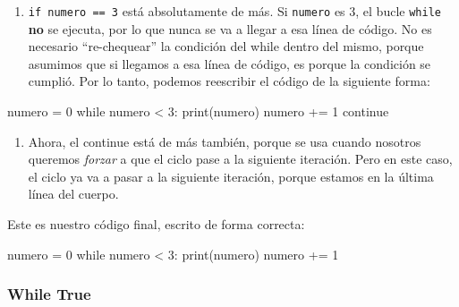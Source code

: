 \documentclass[
  letterpaper,
  DIV=11,
  numbers=noendperiod]{scrreprt}
\newenvironment{Shaded}{\begin{snugshade}}{\end{snugshade}}
\newcommand{\BuiltInTok}[1]{\textcolor[rgb]{0.00,0.23,0.31}{#1}}
\newcommand{\ControlFlowTok}[1]{\textcolor[rgb]{0.00,0.23,0.31}{#1}}
\newcommand{\DecValTok}[1]{\textcolor[rgb]{0.68,0.00,0.00}{#1}}
\newcommand{\NormalTok}[1]{\textcolor[rgb]{0.00,0.23,0.31}{#1}}
\newcommand{\OperatorTok}[1]{\textcolor[rgb]{0.37,0.37,0.37}{#1}}
\providecommand{\tightlist}{%
  \setlength{\itemsep}{0pt}\setlength{\parskip}{0pt}}\usepackage{longtable,booktabs,array}
\begin{document}
\begin{enumerate}
\def\labelenumi{\arabic{enumi}.}
\tightlist
\item
  \texttt{if\ numero\ ==\ 3} está absolutamente de más. Si
  \texttt{numero} es 3, el bucle \texttt{while} \textbf{no} se ejecuta,
  por lo que nunca se va a llegar a esa línea de código. No es necesario
  ``re-chequear'' la condición del while dentro del mismo, porque
  asumimos que si llegamos a esa línea de código, es porque la condición
  se cumplió. Por lo tanto, podemos reescribir el código de la siguiente
  forma:
\end{enumerate}

\begin{Shaded}
\begin{Highlighting}[]
\NormalTok{numero }\OperatorTok{=} \DecValTok{0} 
\ControlFlowTok{while}\NormalTok{ numero }\OperatorTok{\textless{}} \DecValTok{3}\NormalTok{:}
  \BuiltInTok{print}\NormalTok{(numero)}
\NormalTok{  numero }\OperatorTok{+=} \DecValTok{1}
  \ControlFlowTok{continue}
\end{Highlighting}
\end{Shaded}

\begin{enumerate}
\def\labelenumi{\arabic{enumi}.}
\setcounter{enumi}{1}
\tightlist
\item
  Ahora, el continue está de más también, porque se usa cuando nosotros
  queremos \emph{forzar} a que el ciclo pase a la siguiente iteración.
  Pero en este caso, el ciclo ya va a pasar a la siguiente iteración,
  porque estamos en la última línea del cuerpo.
\end{enumerate}

Este es nuestro código final, escrito de forma correcta:

\begin{Shaded}
\begin{Highlighting}[]
\NormalTok{numero }\OperatorTok{=} \DecValTok{0} 
\ControlFlowTok{while}\NormalTok{ numero }\OperatorTok{\textless{}} \DecValTok{3}\NormalTok{:}
  \BuiltInTok{print}\NormalTok{(numero)}
\NormalTok{  numero }\OperatorTok{+=} \DecValTok{1}
\end{Highlighting}
\end{Shaded}

\hypertarget{while-true}{%
\subsubsection{While True}\label{while-true}}
\end{document}
